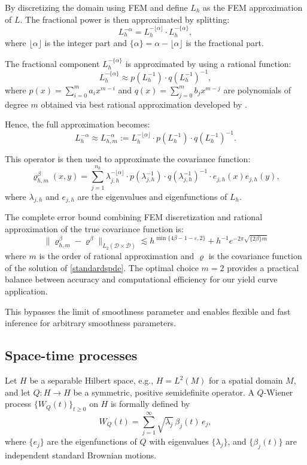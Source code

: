 \documentclass[
  12pt]{article}
\begin{document}
By discretizing the domain using FEM and define $L_h$ as the FEM approximation of $L$. The fractional power is then approximated by splitting:
\[
L_h^{-\alpha} = L_h^{-\lfloor \alpha \rfloor} \cdot L_h^{-\{\alpha\}},
\]
where $\lfloor \alpha \rfloor$ is the integer part and $\{\alpha\} = \alpha - \lfloor \alpha \rfloor$ is the fractional part.

The fractional component $L_h^{-\{\alpha\}}$ is approximated by using a rational function:
\[
L_h^{-\{\alpha\}} \approx p(L_h^{-1}) \cdot q(L_h^{-1})^{-1},
\]
where $p(x) = \sum_{i=0}^{m} a_i x^{m - i}$ and $q(x) = \sum_{j=0}^{m} b_j x^{m - j}$ are polynomials of degree $m$ obtained via best rational approximation developed by \cite{hofreither2021algorithm}.

Hence, the full approximation becomes:
\[
L_h^{-\alpha} \approx L_{h,m}^{-\alpha} := L_h^{-\lfloor \alpha \rfloor} \cdot p(L_h^{-1}) \cdot q(L_h^{-1})^{-1}.
\]

This operator is then used to approximate the covariance function:
\[
\varrho_{h,m}^{\beta}(x, y) = \sum_{j=1}^{n_h} \lambda_{j,h}^{-\lfloor \alpha \rfloor} \cdot p(\lambda_{j,h}^{-1}) \cdot q(\lambda_{j,h}^{-1})^{-1} \cdot e_{j,h}(x) e_{j,h}(y),
\]
where $\lambda_{j,h}$ and $e_{j,h}$ are the eigenvalues and eigenfunctions of $L_h$.

The complete error bound combining FEM discretization and rational approximation of the true covariance function is:
\[
\|\varrho_{h,m}^{\beta} - \varrho^\beta\|_{L_2(\mathcal{D}\times\mathcal{D})} \lesssim h^{\min\{4\beta-1-\varepsilon,2\}} + h^{-1} e^{-2\pi\sqrt{\{2\beta\}m}}
\]
where $m$ is the order of rational approximation and $\varrho$ is the covariance function of the solution of \eqref{standardspde}. The optimal choice $m = 2$ provides a practical balance between accuracy and computational efficiency for our yield curve application.

This bypasses the limit of smoothness parameter and enables flexible and fast inference for arbitrary smoothness parameters.

\subsection{Space-time processes} \label{stprocess}
Let $H$ be a separable Hilbert space, e.g., $H = L^2(M)$ for a spatial domain $M$, and let $Q \colon H \to H$ be a symmetric, positive semidefinite operator. 
A $Q$-Wiener process $\{ W_Q(t) \}_{t \ge 0}$ on $H$ is formally defined by
\[
    W_Q(t) = \sum_{j=1}^{\infty} \sqrt{\lambda_j}\, \beta_j(t)\, e_j,
\]
where $\{e_j\}$ are the eigenfunctions of $Q$ with eigenvalues $\{\lambda_j\}$, and $\{\beta_j(t)\}$ are independent standard Brownian motions. 
\end{document}
